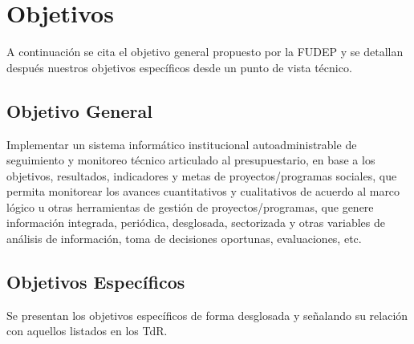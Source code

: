 \section{Objetivos}

A continuación se cita el objetivo general propuesto por la FUDEP y se detallan después nuestros objetivos específicos desde un punto de vista técnico.

\subsection{Objetivo General}

Implementar un sistema informático institucional autoadministrable de seguimiento y monitoreo técnico articulado al presupuestario, 
en base a los objetivos, resultados, indicadores y metas de proyectos/programas sociales, que permita monitorear los avances cuantitativos y cualitativos de acuerdo al marco lógico u otras herramientas de gestión de proyectos/programas,
que genere información integrada, periódica, desglosada, sectorizada y otras variables de análisis de información, toma de decisiones oportunas, evaluaciones, etc.

\subsection{Objetivos Específicos}

Se presentan los objetivos específicos de forma desglosada y señalando su relación con aquellos listados en los TdR. 


